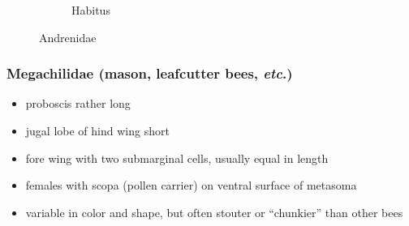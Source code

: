 \documentclass[letterpaper, 11pt]{article}
\begin{document}
\begin{figure}[ht!]
\begin{subfigure}[ht!]{0.38\textwidth}
        \caption{Habitus \citep[][Fig. 116]{goulet1993hymenoptera}}
        \label{fig:andrenid2}
    \end{subfigure}
    \caption{Andrenidae}\label{fig:andrenids}
\end{figure}

\subsubsection{Megachilidae (mason, leafcutter bees, \textit{etc}.)}
\begin{itemize}
\item proboscis rather long
\item jugal lobe of hind wing short
\item fore wing with two submarginal cells, usually equal in length
\item females with scopa (pollen carrier) on ventral surface of metasoma
\item variable in color and shape, but often stouter or ``chunkier'' than other bees
\end{itemize}
\end{document}
